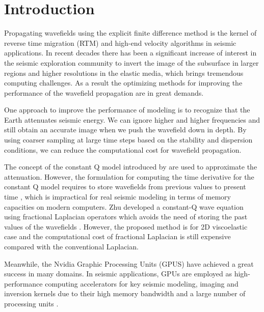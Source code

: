 \documentclass{paris17}
\begin{document}
\section{Introduction}

Propagating wavefields using the explicit finite difference method is the kernel of reverse time migration (RTM) and high-end velocity algorithms in seismic applications. In recent decades there has been a significant increase of interest in the seismic exploration community to invert the image of the subsurface in larger regions and higher resolutions in the elastic media, which brings tremendous computing challenges. As a result the optimizing methods for improving the performance of the wavefield propagation are in great demands.




One approach to improve the performance of modeling is to recognize that the Earth attenuates seismic energy. We can ignore higher and higher frequencies and still obtain an accurate image\cite[]{Clapp.sep.111.bob3} when we push the wavefield down in depth. By using coarser sampling at large time steps based on the stability and dispersion conditions, we can reduce the computational cost for wavefield propagation. 

The concept of the constant Q model introduced by \cite{Kjartansson.sep.23} are used to approximate the attenuation. However, the formulation for computing the time derivative for the constant Q model requires to store wavefields from previous values to present time \cite[]{podlubny1998fractional}, which is impractical for real seismic modeling in terms of memory capacities on modern computers. Zhu developed a constant-Q wave equation using fractional Laplacian operators which avoids the need of storing the past values of the wavefields \cite[]{zhu2014theory}. However, the proposed method is for 2D viscoelastic case and the computational cost of fractional Laplacian is still expensive compared with the conventional Laplacian.

Meanwhile, the Nvidia Graphic Processing Units (GPUS)  have achieved a great success in many domains. In seismic applications, GPUs are employed as high-performance computing accelerators for key seismic modeling, imaging and inversion kernels due to their high memory bandwidth and a large number of processing units \cite[]{he2015gpu}.
\end{document}
